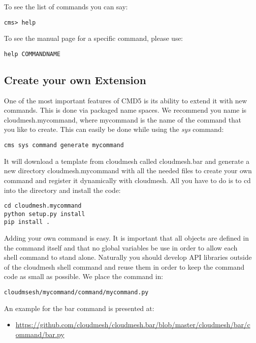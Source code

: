 To see the list of commands you can say:

\begin{verbatim}
cms> help
\end{verbatim}

To see the manual page for a specific command, please use:

\begin{verbatim}
help COMMANDNAME
\end{verbatim}

\subsection{Create your own Extension}\label{create-your-own-extension}

One of the most important features of CMD5 is its ability to extend it
with new commands. This is done via packaged name spaces. We recommend
you name is cloudmesh.mycommand, where mycommand is the name of the
command that you like to create. This can easily be done while using the
\emph{sys} command:

\begin{verbatim}
cms sys command generate mycommand
\end{verbatim}

It will download a template from cloudmesh called cloudmesh.bar and
generate a new directory cloudmesh.mycommand with all the needed files
to create your own command and register it dynamically with cloudmesh.
All you have to do is to cd into the directory and install the code:

\begin{verbatim}
cd cloudmesh.mycommand
python setup.py install
pip install .
\end{verbatim}

Adding your own command is easy. It is important that all objects are
defined in the command itself and that no global variables be use in
order to allow each shell command to stand alone. Naturally you should
develop API libraries outside of the cloudmesh shell command and reuse
them in order to keep the command code as small as possible. We place
the command in:

\begin{verbatim}
cloudmsesh/mycommand/command/mycommand.py
\end{verbatim}

An example for the bar command is presented at:

\begin{itemize}

\item
  \url{https://github.com/cloudmesh/cloudmesh.bar/blob/master/cloudmesh/bar/command/bar.py}
\end{itemize}

